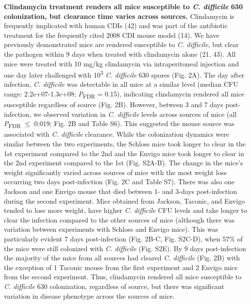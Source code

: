 \documentclass[
  11pt,
]{article}
\begin{document}
\textbf{Clindamycin treatment renders all mice susceptible to \emph{C.
difficile} 630 colonization, but clearance time varies across sources.}
Clindamycin is frequently implicated with human CDIs (42) and was part
of the antibiotic treatment for the frequently cited 2008 CDI mouse
model (14). We have previously demonstrated mice are rendered
susceptible to \emph{C. difficile}, but clear the pathogen within 9 days
when treated with clindamycin alone (21, 43). All mice were treated with
10 mg/kg clindamycin via intraperitoneal injection and one day later
challenged with 10\textsuperscript{3} \emph{C. difficile} 630 spores
(Fig. 2A). The day after infection, \emph{C. difficile} was detectable
in all mice at a similar level (median CFU range: 2.2e+07-1.3e+08;
\emph{P}\textsubscript{FDR} = 0.15), indicating clindamycin rendered all
mice susceptible regardless of source (Fig. 2B). However, between 3 and
7 days post-infection, we observed variation in \emph{C. difficile}
levels across sources of mice (all \emph{P}\textsubscript{FDR} \(\le\)
0.019; Fig. 2B and Table S6). This suggested the mouse source was
associated with \emph{C. difficile} clearance. While the colonization
dynamics were similar between the two experiments, the Schloss mice took
longer to clear in the 1st experiment compared to the 2nd and the Envigo
mice took longer to clear in the 2nd experiment compared to the 1st
(Fig. S2A-B). The change in the mice's weight significantly varied
across sources of mice with the most weight loss occurring two days
post-infection (Fig. 2C and Table S7). There was also one Jackson and
one Envigo mouse that died between 1- and 3-days post-infection during
the second experiment. Mice obtained from Jackson, Taconic, and Envigo
tended to lose more weight, have higher \emph{C. difficile} CFU levels
and take longer to clear the infection compared to the other sources of
mice (although there was variation between experiments with Schloss and
Envigo mice). This was particularly evident 7 days post-infection (Fig.
2B-C, Fig. S2C-D), when 57\% of the mice were still colonized with
\emph{C. difficile} (Fig. S2E). By 9 days post-infection the majority of
the mice from all sources had cleared \emph{C. difficile} (Fig. 2B) with
the exception of 1 Taconic mouse from the first experiment and 2 Envigo
mice from the second experiment. Thus, clindamycin rendered all mice
susceptible to \emph{C. difficile} 630 colonization, regardless of
source, but there was significant variation in disease phenotype across
the sources of mice.
\end{document}
